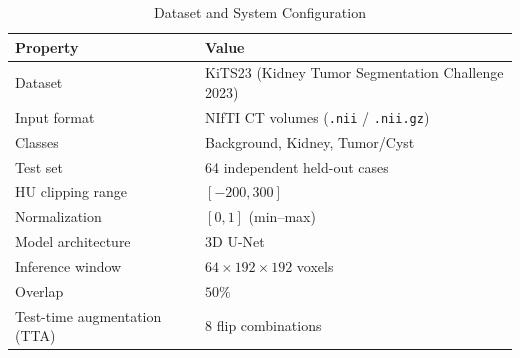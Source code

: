 
\begin{table}[!t]
\caption{Dataset and System Configuration}
\label{tab:dataset_config}
\centering
\begin{tabular}{@{}ll@{}}
\toprule
\textbf{Property} & \textbf{Value} \\
\midrule
Dataset & KiTS23 (Kidney Tumor Segmentation Challenge 2023) \\
Input format & NIfTI CT volumes (\texttt{.nii} / \texttt{.nii.gz}) \\
Classes & Background, Kidney, Tumor/Cyst \\
Test set & 64 independent held-out cases \\
\midrule
HU clipping range & $[-200, 300]$ \\
Normalization & $[0, 1]$ (min--max) \\
\midrule
Model architecture & 3D U-Net \\
Inference window & $64 \times 192 \times 192$ voxels \\
Overlap & $50\%$ \\
Test-time augmentation (TTA) & 8 flip combinations \\
\bottomrule
\end{tabular}
\end{table}

